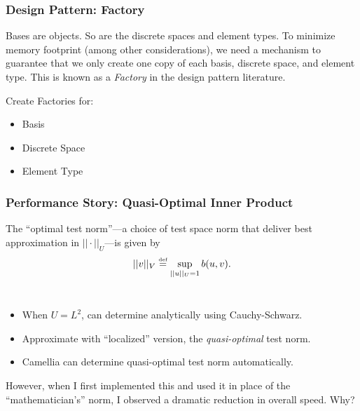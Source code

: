 \documentclass[mathserif]{beamer}
\newcommand{\eqdef}{\stackrel{\text{\tiny def}}{=}}
\begin{document}
\begin{frame}
\frametitle{Design Pattern: Factory}

Bases are objects.  So are the discrete spaces and element types.  To minimize memory footprint (among
other considerations), we need a mechanism to guarantee that we only create one copy of each basis, discrete
space, and element type.  This is known as a \emph{Factory} in the design pattern literature.

\begin{block}{Create Factories for:}
\begin{itemize}
\item Basis
\item Discrete Space
\item Element Type
\end{itemize}
\end{block}

\end{frame}

\begin{frame}
\frametitle{Performance Story: Quasi-Optimal Inner Product}

The ``optimal test norm''---a choice of test space norm that deliver best approximation in $||\cdot||_{U}$---is given by 
\begin{align*}
||v||_{V}\eqdef \sup_{||u||_{U}=1} b(u,v).
\end{align*}
\\
\begin{itemize}
\item When $U=L^{2}$, can determine analytically using Cauchy-Schwarz.
\item Approximate with ``localized'' version, the \emph{quasi-optimal} test norm.
\item Camellia can determine quasi-optimal test norm automatically.
\end{itemize}

However, when I first implemented this and used it in place of the ``mathematician's'' norm, I observed a dramatic reduction in overall speed.  Why?

\end{frame}
\end{document}

